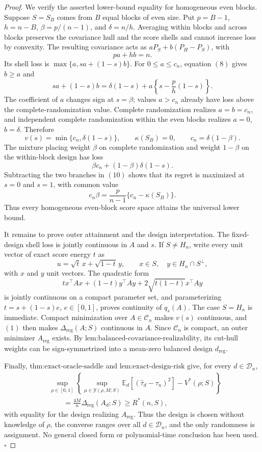 \documentclass{article}
\begin{document}
\begin{proof}
We verify the asserted lower-bound equality for homogeneous even blocks.  Suppose \(S=S_B\) comes from \(B\) equal blocks of even size.  Put \(p=B-1\), \(h=n-B\), \(\beta=p/(n-1)\), and \(\delta=n/h\).  Averaging within blocks and across blocks preserves the covariance hull and the score shells and cannot increase loss by convexity.  The resulting covariance acts as \(aP_S+b(P_H-P_S)\), with
\[
pa+hb=n.
\tag{8}
\]
Its shell loss is \(\max\{a,sa+(1-s)b\}\).  For \(0\leq a\leq c_n\), equation \((8)\) gives \(b\geq a\) and
\[
sa+(1-s)b
=\delta(1-s)+a\left\{s-\frac{p}{h}(1-s)\right\}.
\tag{9}
\]
The coefficient of \(a\) changes sign at \(s=\beta\); values \(a>c_n\) already have loss above the complete-randomization value.  Complete randomization realizes \(a=b=c_n\), and independent complete randomization within the even blocks realizes \(a=0\), \(b=\delta\).  Therefore
\[
v(s)=\min\{c_n,\delta(1-s)\},
\qquad
\kappa(S_B)=0,
\qquad
c_n=\delta(1-\beta).
\tag{10}
\]
The mixture placing weight \(\beta\) on complete randomization and weight \(1-\beta\) on the within-block design has loss
\[
\beta c_n+(1-\beta)\delta(1-s).
\]
Subtracting the two branches in \((10)\) shows that its regret is maximized at \(s=0\) and \(s=1\), with common value
\[
c_n\beta=\frac{p}{n-1}\{c_n-\kappa(S_B)\}.
\tag{11}
\]
Thus every homogeneous even-block score space attains the universal lower bound.

It remains to prove outer attainment and the design interpretation.  The fixed-design shell loss is jointly continuous in \(A\) and \(s\).  If \(S\neq H_n\), write every unit vector of exact score energy \(t\) as
\[
u=\sqrt t\,x+\sqrt{1-t}\,y,
\qquad x\in S,\quad y\in H_n\cap S^\perp,
\]
with \(x\) and \(y\) unit vectors.  The quadratic form
\[
t x^\top Ax+(1-t)y^\top Ay
+2\sqrt{t(1-t)}x^\top Ay
\]
is jointly continuous on a compact parameter set, and parameterizing \(t=s+(1-s)e\), \(e\in[0,1]\), proves continuity of \(q_s(A)\).  The case \(S=H_n\) is immediate.  Compact minimization over \(A\in\mathcal C_n\) makes \(v(s)\) continuous, and \((1)\) then makes \(\Delta_{\mathrm{reg}}(A;S)\) continuous in \(A\).  Since \(\mathcal C_n\) is compact, an outer minimizer \(A_{\mathrm{reg}}\) exists.  By \(\text{lem:balanced-covariance-realizability}\), its cut-hull weights can be sign-symmetrized into a mean-zero balanced design \(d_{\mathrm{reg}}\).

Finally, \(\text{thm:exact-oracle-saddle}\) and \(\text{lem:exact-design-risk}\) give, for every \(d\in\mathcal D_n\),
\[
\begin{aligned}
&\sup_{\rho\in[0,1]}
\left\{
\sup_{\mu\in\mathcal Y(\rho,M;S)}
\mathbb E_d[(\widehat\tau_d-\tau_n)^2]-V^*(\rho;S)
\right\}\\
&\qquad=\frac{4M}{n}\Delta_{\mathrm{reg}}(A_d;S)
\geq R^*(n,S),
\end{aligned}
\tag{12}
\]
with equality for the design realizing \(A_{\mathrm{reg}}\).  Thus the design is chosen without knowledge of \(\rho\), the converse ranges over all \(d\in\mathcal D_n\), and the only randomness is assignment.  No general closed form or polynomial-time conclusion has been used. \(\square\)
\end{proof}
\end{document}
